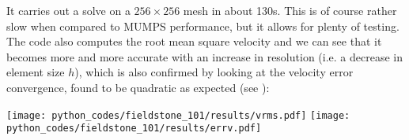 It carries out a solve on a $256\times 256$ mesh in about 130s. This is of course rather slow when compared to 
MUMPS performance, but it allows for plenty of testing.
The code also computes the root mean square velocity and we can see that it becomes more and more accurate with 
an increase in resolution (i.e. a decrease in element size $h$), which is also confirmed by looking at the 
velocity error convergence, found to be quadratic as expected (see ):

\begin{center}
\texttt{[image: python\_codes/fieldstone\_101/results/vrms.pdf]}
\texttt{[image: python\_codes/fieldstone\_101/results/errv.pdf]}
\end{center}


